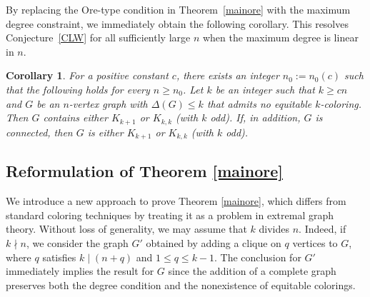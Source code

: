 \documentclass[11pt, a4paper]{article}
\newtheorem{corollary}[theorem]{Corollary}
\theoremstyle{definition}
\newtheorem{problem}[theorem]{Problem}
\newcommand{\<}{\subseteq}
\begin{document}
By replacing the Ore-type condition in Theorem~\ref{mainore} with the maximum degree constraint, we immediately obtain the following corollary. This resolves Conjecture~\ref{CLW} for all sufficiently large 
$n$ when the maximum degree is linear in $n$.



\begin{corollary}\label{Dirac}
   For a positive constant $c$, there exists an integer $n_0:=n_0(c)$ such that the following holds for every $n\geq n_0$. Let $k$ be an integer such that $k \geq cn$ and $G$ be an $n$-vertex graph with $\Delta(G)\le k$ that admits no equitable $k$-coloring. Then $G$ contains either $K_{k+1}$ or $K_{k,k}$ (with $k$ odd). If, in addition, $G$ is connected, then $G$ is either $K_{k+1}$ or $K_{k,k}$ (with $k$ odd).%
\end{corollary}
















\subsection{Reformulation of Theorem \ref{mainore}}%

We introduce a new approach to prove Theorem \ref{mainore}, which differs from standard coloring techniques by treating it as a problem in extremal graph theory. Without loss of generality, we may assume that $k$ divides $n$. Indeed, if $k\nmid n$, we consider the graph $G'$ obtained by adding a clique on $q$ vertices to $G$, where $q$ satisfies $k\mid (n+q)$ and $1\leq q\leq k-1$. The conclusion for $G'$ immediately implies the result for $G$ since the addition of a complete graph preserves both the degree condition and the nonexistence of equitable colorings. 
\end{document}

